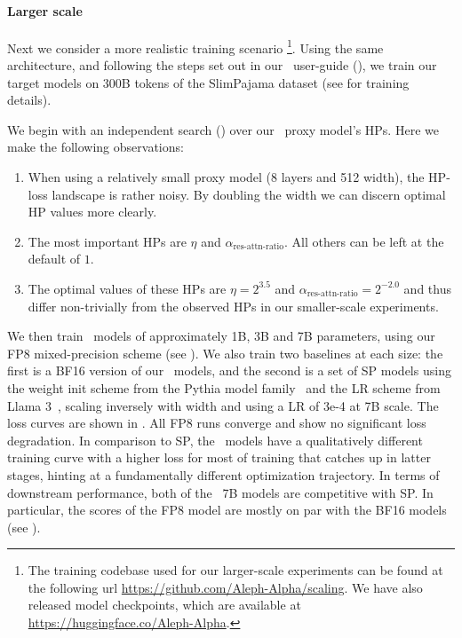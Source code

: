 
\paragraph{Larger scale} Next we consider a more realistic training scenario \footnote{The training codebase used for our larger-scale experiments can be found at the following url \url{https://github.com/Aleph-Alpha/scaling}. We have also released model checkpoints, which are available at \url{https://huggingface.co/Aleph-Alpha}.}.
Using the same architecture, and following the steps set out in our \umup\ user-guide (), we train our target models on 300B tokens of the SlimPajama dataset \citep{SlimPajama} (see  for training details).

We begin with an independent search () over our \umup\ proxy model's HPs. Here we make the following observations:
\begin{enumerate}
    \item When using a relatively small proxy model (8 layers and 512 width), the HP-loss landscape is rather noisy. By doubling the width we can discern optimal HP values more clearly.
    \item The most important HPs are $\eta$ and $\alpha_\mathrm{res\text{-}attn\text{-}ratio}$. All others can be left at the default of $1$.
    \item The optimal values of these HPs are $\eta = 2^{3.5}$ and $\alpha_\mathrm{res\text{-}attn\text{-}ratio} = 2^{-2.0}$ and thus differ non-trivially from the observed HPs in our smaller-scale experiments.
\end{enumerate}

We then train \umup\ models of approximately 1B, 3B and 7B parameters, using our FP8 mixed-precision scheme (see ). We also train two baselines at each size: the first is a BF16 version of our \umup\ models, and the second is a set of SP models using the weight init scheme from the Pythia model family~\citep{Pythia} and the LR scheme from Llama 3~\citep{LLAMA3}, scaling inversely with width and using a LR of 3e-4 at 7B scale.
The loss curves are shown in . All FP8 runs converge and show no significant loss degradation. In comparison to SP, the \umup\ models have a qualitatively different training curve with a higher loss for most of training that catches up in latter stages, hinting at a fundamentally different optimization trajectory. In terms of downstream performance, both of the \umup\ 7B models are competitive with SP. In particular, the scores of the FP8 model are mostly on par with the BF16 models (see ).

